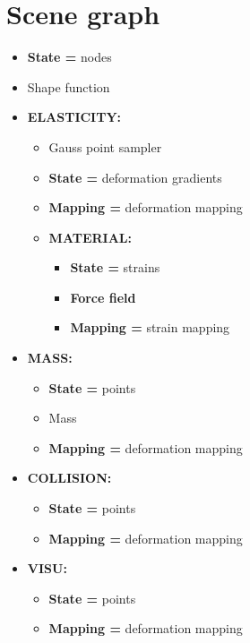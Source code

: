 \newpage
\section{Scene graph}

\begin{itemize}
 \item \textbf{State =} nodes
 \item Shape function

 \item \textbf{ELASTICITY:}
  \begin{itemize}
  \item Gauss point sampler
  \item \textbf{State =} deformation gradients
  \item \textbf{Mapping =} deformation mapping

  \item \textbf{MATERIAL:}
    \begin{itemize}
    \item \textbf{State =} strains
    \item \textbf{Force field}
    \item \textbf{Mapping =} strain mapping
    \end{itemize}
  \end{itemize}

 \item \textbf{MASS:}
    \begin{itemize}
    \item \textbf{State =} points 
    \item Mass
    \item \textbf{Mapping =} deformation mapping
    \end{itemize}
 \item \textbf{COLLISION:}
    \begin{itemize}
    \item \textbf{State =} points 
    \item \textbf{Mapping =} deformation mapping
    \end{itemize}
 \item \textbf{VISU:}
    \begin{itemize}
    \item \textbf{State =} points 
    \item \textbf{Mapping =} deformation mapping
    \end{itemize}

\end{itemize}

